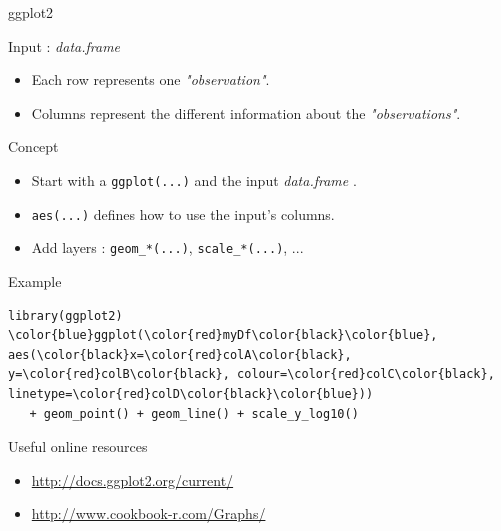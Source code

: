 \documentclass[10pt]{beamer}
\newcommand{\df}{{\it data.frame} }
\begin{document}
\begin{frame}[fragile, shrink=10]{{\sf ggplot2}}
  \begin{block}{Input : \df}
    \begin{itemize}
    \item Each row represents one {\it "observation"}.
    \item Columns represent the different information about the {\it "observations"}.
    \end{itemize}
  \end{block}

  \begin{block}{Concept}
    \begin{itemize}
    \item Start with a \verb!ggplot(...)! and the input \df.
    \item \verb!aes(...)! defines how to use the input's columns.
    \item Add layers : \verb!geom_*(...)!, \verb!scale_*(...)!, ...
    \end{itemize}
  \end{block}

  \begin{exampleblock}{Example}
\begin{Verbatim}[commandchars=\\\{\}]
library(ggplot2)
\color{blue}ggplot(\color{red}myDf\color{black}\color{blue}, aes(\color{black}x=\color{red}colA\color{black}, y=\color{red}colB\color{black}, colour=\color{red}colC\color{black}, linetype=\color{red}colD\color{black}\color{blue}))
   + geom_point() + geom_line() + scale_y_log10()
\end{Verbatim}
  \end{exampleblock}

  \begin{block}{Useful online resources}
    \begin{itemize}
    \item \url{http://docs.ggplot2.org/current/}
    \item \url{http://www.cookbook-r.com/Graphs/}
    \end{itemize}
  \end{block}

\end{frame}
\end{document}
